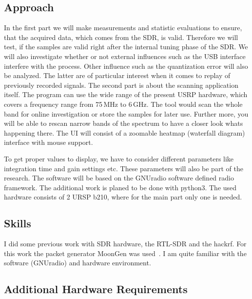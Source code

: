 \documentclass[NET,a4paper,12pt,english]{netforms}
\begin{document}
\subsection*{Approach}
In the first part we will make measurements and statistic evaluations to
ensure, that the acquired data, which comes from the SDR, is valid.  Therefore
we will test, if the samples are valid right after the internal tuning phase of
the SDR.
We will also investigate whether or not external influences such as the USB
interface interfere with the process.
Other influence such as the quantization error will also be analyzed.
The latter are of particular interest when it comes to replay of previously
recorded signals.
The second part is about the scanning application itself.
The program can use the wide range of the present USRP hardware, which covers a
frequency range from 75\,MHz to 6\,GHz.
The tool would scan the whole band for online investigation or store the
samples for later use.
Further more, you will be able to rescan narrow bands of the spectrum to have a
closer look whats happening there.
The UI will consist of a zoomable heatmap (waterfall diagram) interface with
mouse support.

To get proper values to display, we have to consider different parameters like
integration time and gain settings etc.
These parameters will also be part of the research.
The software will be based on the GNUradio software defined radio
framework.  The additional work is planed to be done with python3.
The used hardware consists of 2 URSP b210, where for the main part only one is
needed.

\subsection*{Skills}

I did some previous work with SDR hardware, the RTL-SDR and the
hackrf.
For this work the packet generator MoonGen was used~\cite{DBLP:conf/imc/EmmerichGRWC15}.
I am quite familiar with the software (GNUradio) and
hardware environment.

\subsection*{Additional Hardware Requirements}
\end{document}
